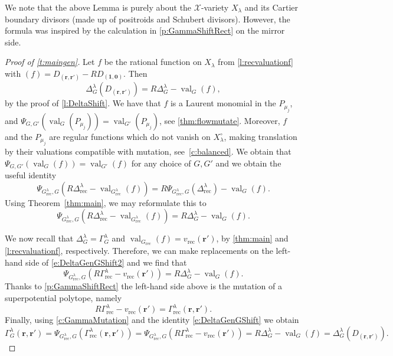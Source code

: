 \documentclass{amsart}
\theoremstyle{definition}
\numberwithin{equation}{section}
\newcommand{\rect}{\mathrm{rec}}
\newcommand{\val}{{\operatorname{val}}}
\begin{document}
We note that the above Lemma is purely about the $\mathcal X$-variety $X_\lambda$ and its Cartier boundary divisors (made up of positroids and Schubert divisors). However, the formula was inspired by the calculation in 
\cref{p:GammaShiftRect} on the mirror side.


\begin{proof}[Proof of \cref{t:maingen}]


Let $f$ be the rational function on $X_\lambda$ from \cref{l:recvaluationf} with $(f)=D_{(\mathbf {r},\mathbf {r'})}-RD_{(\mathbf 1,\mathbf 0)}$.  Then
\begin{equation}\label{e:DeltaGenGShift}
\Delta^\lambda_G(D_{(\mathbf {r},\mathbf {r'})})=R \Delta^\lambda_G-\val_{G}(f),
\end{equation}   
	by the proof of \cref{l:DeltaShift}. We have that $f$ is a Laurent monomial in the $P_{\mu_j}$, and $\Psi_{G,G'}(\val_{G}(P_{\mu_j}))=\val_{G'}(P_{\mu_j})$, see 
\cref{thm:flowmutate}.
Moreover,  $f$ and the $P_{\mu_j}$ are regular functions which do not vanish
on $X_\lambda^\circ$, making translation by their valuations compatible with mutation, see~\cref{c:balanced}. We obtain that $\Psi_{G,G'}(\val_{G}(f))=\val_{G'}(f)$ for any choice of $G, G'$ and we obtain the useful identity
\[
\Psi_{G^\lambda_\rect,G}(R \Delta^\lambda_\rect-\val_{G^\lambda_\rect}(f))=R\Psi_{G^\lambda_\rect,G}(\Delta^\lambda_\rect)-\val_{G}(f).
\] 
Using Theorem~\ref{thm:main}, we may reformulate this to   
\begin{equation}\label{e:DeltaGenGShift2}
\Psi_{G^\lambda_\rect,G}(R \Delta^\lambda_\rect-\val_{G^\lambda_\rect}(f))
=R\Delta^\lambda_G-\val_{G}(f).
\end{equation}   

We now recall that $\Delta^\lambda_G=\Gamma^\lambda_G$ and  $\val_{G_\rect}(f)=v_\rect(\mathbf r')$, by \cref{thm:main} and \cref{l:recvaluationf}, respectively. Therefore, we can make replacements on the left-hand side of \eqref{e:DeltaGenGShift2} and we find that
\[
\Psi_{G^\lambda_\rect,G}(R \Gamma^\lambda_\rect-v_\rect(\mathbf r'))=R\Delta^\lambda_G-\val_{G}(f). 
\]
Thanks to \cref{p:GammaShiftRect} the left-hand side above is the mutation of a superpotential polytope, namely 
\[
	R\Gamma^\lambda_{\rect}-v_{\rect}(\mathbf r') = 
\Gamma^\lambda_{\rect}({\mathbf {r},\mathbf {r'}}).
\]
Finally, using \cref{c:GammaMutation} and the identity \eqref{e:DeltaGenGShift} we obtain
\[
\Gamma_G^\lambda(\mathbf r,\mathbf r')= \Psi_{G^\lambda_\rect,G}(\Gamma_\rect^\lambda(\mathbf r,\mathbf r'))=
\Psi_{G^\lambda_\rect,G}(R \Gamma^\lambda_\rect-v_\rect(\mathbf r'))=R\Delta^\lambda_G-\val_{G}(f)=\Delta^\lambda_G(D_{(\mathbf {r},\mathbf {r'})}).
\] 
\end{proof}
\end{document}
